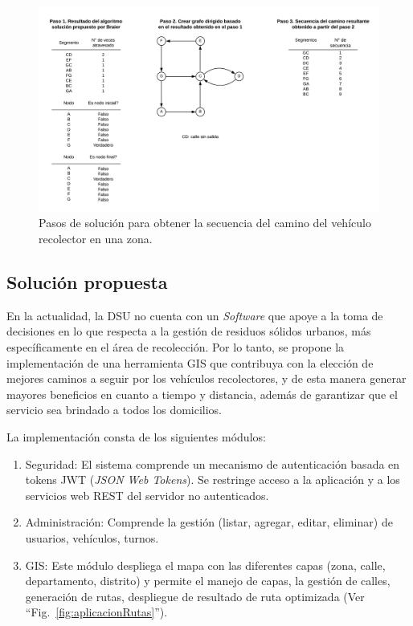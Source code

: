 \begin{figure}[htbp]
\centerline{\includegraphics[width=\textwidth]{pasos_de_solucion.png}}
\caption{Pasos de solución para obtener la secuencia del camino del vehículo recolector en una zona.}
\label{fig:PasosSolucion}
\end{figure}

\subsection{Solución propuesta}

En la actualidad, la DSU no cuenta con un \textit{Software} que apoye a la toma de decisiones en lo que respecta a la gestión de residuos sólidos urbanos, más específicamente en el área de recolección. Por lo tanto, se propone la implementación de una herramienta GIS que contribuya con la elección de mejores caminos a seguir por los vehículos recolectores, y de esta manera generar mayores beneficios en cuanto a tiempo y distancia, además de garantizar que el servicio sea brindado a todos los domicilios.

La implementación consta de los siguientes módulos:
\begin{enumerate}
    \item Seguridad: El sistema comprende un mecanismo de autenticación basada en tokens JWT (\textit{JSON Web Tokens}). Se restringe acceso a la aplicación y a los servicios web REST del servidor no autenticados.
    \item Administración: Comprende la gestión (listar, agregar, editar, eliminar) de usuarios, vehículos, turnos.
    \item GIS: Este módulo despliega el mapa con las diferentes capas (zona, calle, departamento, distrito) y permite el manejo de capas, la gestión de calles, generación de rutas, despliegue de resultado de ruta optimizada (Ver ``Fig.~\ref{fig:aplicacionRutas}'').
\end{enumerate}

